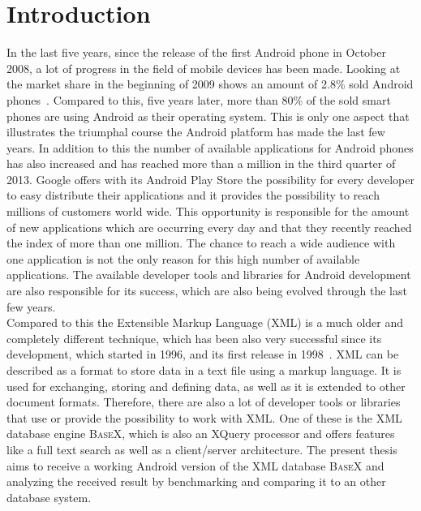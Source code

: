 \chapter{Introduction}
\label{cha:introduction}
In the last five years, since the release of the first Android phone in October 2008, a lot of progress in the field of mobile devices has been made.
Looking at the market share in the beginning of 2009 shows an amount of 2.8\% sold Android phones~\cite{gandhewar2010google}.
Compared to this, five years later, more than 80\% of the sold smart phones are using Android as their operating system.
This is only one aspect that illustrates the triumphal course the Android platform has made the last few years.
In addition to this the number of available applications for Android phones has also increased and has reached more than a million in the third quarter of 2013.
Google offers with its Android Play Store the possibility for every developer to easy distribute their applications and it provides the possibility to reach millions of customers world wide.
This opportunity is responsible for the amount of new applications which are occurring every day and that they recently reached the index of more than one million.
The chance to reach a wide audience with one application is not the only reason for this high number of available applications.
The available developer tools and libraries for Android development are also responsible for its success, which are also being evolved through the last few years.\\
Compared to this the Extensible Markup Language (XML) is a much older and completely different technique, which has been also very successful since its development, which started in 1996, and its first release in 1998~\cite{bray1998extensible}.
XML can be described as a format to store data in a text file using a markup language.
It is used for exchanging, storing and defining data, as well as it is extended to other document formats.
Therefore, there are also a lot of developer tools or libraries that use or provide the possibility to work with XML.
One of these is the XML database engine \textsc{BaseX}, which is also an XQuery processor and offers features like a full text search as well as a client/server architecture.
The present thesis aims to receive a working Android version of the XML database \textsc{BaseX} and analyzing the received result by benchmarking and comparing it to an other database system.

\newpage

